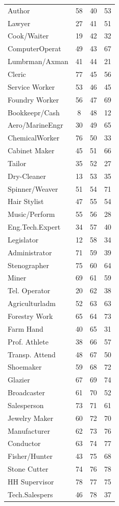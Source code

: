 \begin{tabular}{lccc}
Author&58&40&53\\
Lawyer&27&41&51\\
Cook/Waiter&19&42&32\\
ComputerOperat&49&43&67\\
Lumbrman/Axman&41&44&21\\
Cleric&77&45&56\\
Service Worker&53&46&45\\
Foundry Worker&56&47&69\\
Bookkeepr/Cash&8&48&12\\
Aero/MarineEngr&30&49&65\\
ChemicalWorker&76&50&33\\
Cabinet Maker&45&51&66\\
Tailor&35&52&27\\
Dry-Cleaner&13&53&35\\
Spinner/Weaver&51&54&71\\
Hair Stylist&47&55&54\\
Music/Perform&55&56&28\\
Eng.Tech.Expert&34&57&40\\
Legislator&12&58&34\\
Administrator&71&59&39\\
Stenographer&75&60&64\\
Miner&69&61&59\\
Tel. Operator&20&62&38\\
Agriculturladm&52&63&63\\
Forestry Work&65&64&73\\
Farm Hand&40&65&31\\
Prof. Athlete&38&66&57\\
Transp. Attend&48&67&50\\
Shoemaker&59&68&72\\
Glazier&67&69&74\\
Broadcaster&61&70&52\\
Salesperson&73&71&61\\
Jewelry Maker&60&72&70\\
Manufacturer&62&73&76\\
Conductor&63&74&77\\
Fisher/Hunter&43&75&68\\
Stone Cutter&74&76&78\\
HH Supervisor&78&77&75\\
Tech.Salespers&46&78&37\\
\hline\hline
\end{tabular}
